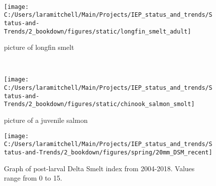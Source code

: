 \documentclass[
]{book}
\begin{document}
\begin{panel-grid}
\begin{columns-nocenter}
\begin{column40}
~

\end{column40}

\begin{column800}

\begin{figure}

{\centering \texttt{[image: C:/Users/laramitchell/Main/Projects/IEP\_status\_and\_trends/Status-and-Trends/2\_bookdown/figures/static/longfin\_smelt\_adult]} 

}

\caption{picture of longfin smelt}\label{fig:unnamed-chunk-41}
\end{figure}

\end{column800}

\begin{column40}

~

\end{column40}

\begin{column800}

\begin{figure}

{\centering \texttt{[image: C:/Users/laramitchell/Main/Projects/IEP\_status\_and\_trends/Status-and-Trends/2\_bookdown/figures/static/chinook\_salmon\_smolt]} 

}

\caption{picture of a juvenile salmon}\label{fig:unnamed-chunk-42}
\end{figure}

\end{column800}

\end{columns-nocenter}

\begin{columns-nocenter}

\begin{column800}

\begin{expand}

\begin{figure}
\texttt{[image: C:/Users/laramitchell/Main/Projects/IEP\_status\_and\_trends/Status-and-Trends/2\_bookdown/figures/spring/20mm\_DSM\_recent]} \caption{Graph of post-larval Delta Smelt index from 2004-2018. Values range from 0 to 15.}\label{fig:unnamed-chunk-43}
\end{figure}


\end{expand}
\end{column800}
\end{columns-nocenter}
\end{panel-grid}
\end{document}
